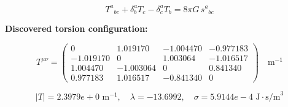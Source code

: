 
\begin{equation}
  T^a{}_{bc} + \delta^a_b T_c - \delta^a_c T_b = 8\pi G \, s^a{}_{bc}
\end{equation}

\textbf{Discovered torsion configuration:}

\begin{equation}
  T^{\mu\nu} = \begin{pmatrix}
    0 & 1.019170 & -1.004470 & -0.977183 \\
    -1.019170 & 0 & 1.003064 & -1.016517 \\
    1.004470 & -1.003064 & 0 & 0.841340 \\
    0.977183 & 1.016517 & -0.841340 & 0
  \end{pmatrix} \quad \text{m}^{-1}
\end{equation}

\begin{equation}
  |T| = 2.3979e+0 \text{ m}^{-1}, \quad
  \lambda = -13.6992, \quad
  \sigma = 5.9144e-4 \text{ J}\cdot\text{s/m}^3
\end{equation}